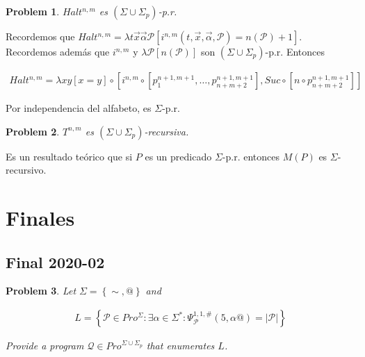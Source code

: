 \documentclass[a4paper, 12pt]{article}
\newtheorem{problem}{Problem}
\newtheorem{problem}{Problem}
\begin{document}
\begin{problem}
    $Halt^{n, m}$ es $(\Sigma \cup \Sigma_p)$-p.r.
\end{problem}

Recordemos que $Halt^{n, m} = \lambda t\vec{x}\vec{\alpha}\mathcal{P} \left[
i^{n, m}(t, \vec{x}, \vec{\alpha}, \mathcal{P}) = n(\mathcal{P}) + 1  \right]$.
Recordemos además que $i^{n, m}$ y $\lambda \mathcal{P} \left[ n(\mathcal{P})
\right]$ son $(\Sigma \cup \Sigma_p)$-p.r. Entonces 

\begin{align*}
    Halt^{n, m} = \lambda xy \left[ x = y  \right] \circ \left[ i^{n, m} \circ
    \left[ p_1^{n+1, m+1}, \ldots, p_{n+m+2}^{n + 1, m+1} \right], Suc \circ
\left[ n \circ p_{n+m+2}^{n + 1, m+1} \right]   \right] 
\end{align*}

Por independencia del alfabeto, es $\Sigma$-p.r. 

\begin{problem}
    $T^{n, m}$ es $(\Sigma \cup \Sigma_p)$-recursiva.
\end{problem}

Es un resultado teórico que si $P$ es un predicado $\Sigma$-p.r. entonces $M(P)$
es $\Sigma$-recursivo.



\pagebreak

\section{Finales}

\subsection{Final 2020-02}

\begin{problem}
    Let $\Sigma = \left\{ \sim , @ \right\} $ and

    \begin{align*}
        L = \left\{ \mathcal{P} \in Pro^{\Sigma} : \exists \alpha \in \Sigma^{*}
        : \Psi_{\mathcal{P}}^{1, 1, \#}(5, \alpha@) = |\mathcal{P}|\right\} 
    \end{align*}

    Provide a program $\mathcal{Q} \in Pro^{\Sigma \cup \Sigma_p}$ that
    enumerates $L$.
\end{problem}
\end{document}
